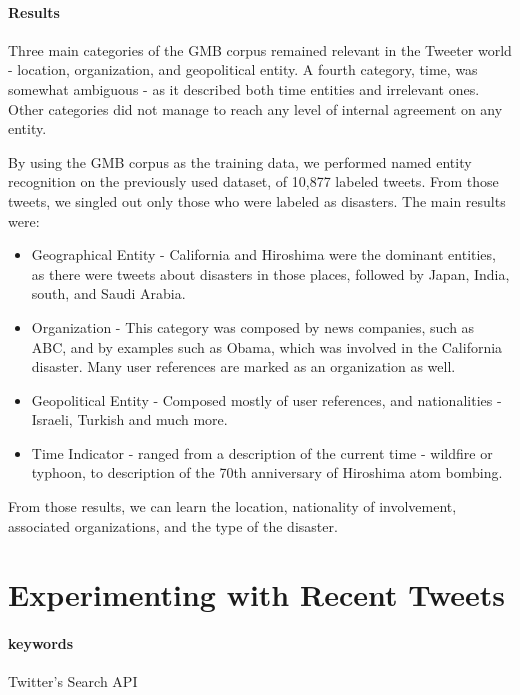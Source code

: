 \documentclass[letterpaper,twocolumn,10pt]{article}
\begin{document}
\paragraph{Results}

Three main categories of the GMB corpus remained relevant in the Tweeter world - location, organization, and geopolitical entity. A fourth category, time, was somewhat ambiguous - as it described both time entities and irrelevant ones. Other categories did not manage to reach any level of internal agreement on any entity.

By using the GMB corpus as the training data, we performed named entity recognition on the previously used dataset, of 10,877 labeled tweets. From those tweets, we singled out only those who were labeled as disasters. The main results were:

\begin{itemize}[noitemsep, nolistsep]
	\item Geographical Entity - California and Hiroshima were the dominant entities, as there were tweets about disasters in those places, followed by Japan, India, south, and Saudi Arabia.
	\item Organization - This category was composed by news companies, such as ABC, and by examples such as Obama, which was involved in the California disaster. Many user references are marked as an organization as well.
	\item Geopolitical Entity - Composed mostly of user references, and nationalities - Israeli, Turkish and much more.
	\item Time Indicator - ranged from a description of the current time - wildfire or typhoon, to description of the 70th anniversary of Hiroshima atom bombing.
\end{itemize}
From those results, we can learn the location, nationality of involvement, associated organizations, and  the type of the disaster.

\section{Experimenting with Recent Tweets} \label{recent-tweets-results}

\paragraph{keywords}Twitter's Search API
\end{document}
